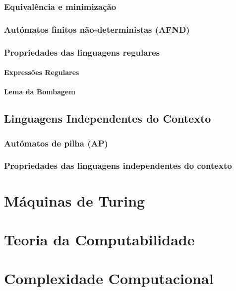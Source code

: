 \documentclass[11pt]{article}
\begin{document}
\subsubsection{Equivalência e minimização}

\subsubsection{Autómatos finitos não-deterministas (AFND)}

\subsubsection{Propriedades das linguagens regulares}

\paragraph{Expressões Regulares}

\paragraph{Lema da Bombagem}

\subsection{Linguagens Independentes do Contexto}

\subsubsection{Autómatos de pilha (AP)}

\subsubsection{Propriedades das linguagens independentes do contexto}

\section{Máquinas de Turing}

\section{Teoria da Computabilidade}

\section{Complexidade Computacional}
\end{document}
